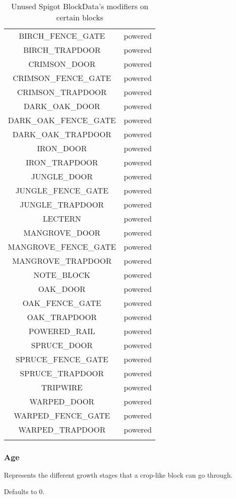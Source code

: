 \begin{longtable}{ |c|c| }
	BIRCH\_FENCE\_GATE & powered \\
	BIRCH\_TRAPDOOR & powered \\
	CRIMSON\_DOOR & powered \\
	CRIMSON\_FENCE\_GATE & powered \\
	CRIMSON\_TRAPDOOR & powered \\
	DARK\_OAK\_DOOR & powered \\
	DARK\_OAK\_FENCE\_GATE & powered \\
	DARK\_OAK\_TRAPDOOR & powered \\
	IRON\_DOOR & powered \\
	IRON\_TRAPDOOR & powered \\
	JUNGLE\_DOOR & powered \\
	JUNGLE\_FENCE\_GATE & powered \\
	JUNGLE\_TRAPDOOR & powered \\
	LECTERN & powered \\
	MANGROVE\_DOOR & powered \\
	MANGROVE\_FENCE\_GATE & powered \\
	MANGROVE\_TRAPDOOR & powered \\
	NOTE\_BLOCK & powered \\
	OAK\_DOOR & powered \\
	OAK\_FENCE\_GATE & powered \\
	OAK\_TRAPDOOR & powered \\
	POWERED\_RAIL & powered \\
	SPRUCE\_DOOR & powered \\
	SPRUCE\_FENCE\_GATE & powered \\
	SPRUCE\_TRAPDOOR & powered \\
	TRIPWIRE & powered \\
	WARPED\_DOOR & powered \\
	WARPED\_FENCE\_GATE & powered \\
	WARPED\_TRAPDOOR & powered \\
	\hline
	
	\caption{Unused Spigot BlockData's modifiers on certain blocks}
	\label{fig:unused-blockdata-blocks}
\end{longtable}

\subsubsection{Age}
Represents the different growth stages that a crop-like block can go through.

Defaults to 0.

